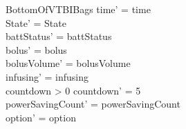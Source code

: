 \begin{schema}{BottomOfVTBIBags}
	time' = time\\ State' = State\\
	battStatus' = battStatus\\
	bolus' = bolus\\
	bolusVolume' = bolusVolume\\
	infusing' = infusing\\
	countdown > 0 \land countdown' = 5\\
	powerSavingCount' = powerSavingCount\\ option' = option\\
\end{schema}

